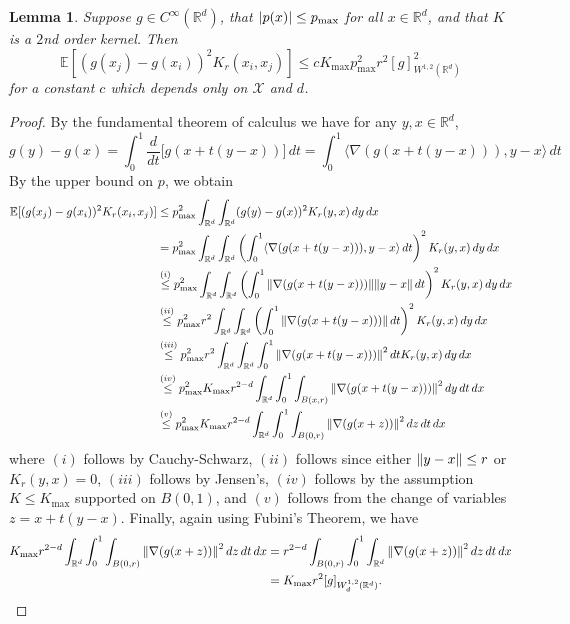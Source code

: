 \documentclass{article}
\newcommand{\Reals}{\mathbb{R}}
\newcommand{\1}{\mathbf{1}}
\newcommand{\Rd}{\Reals^d}
\newcommand{\Xset}{\mathcal{X}}
\newcommand{\Ebb}{\mathbb{E}}
\newcommand{\dotp}[2]{\langle #1, #2 \rangle}
\theoremstyle{alden}
\theoremstyle{aldenthm}
\newtheorem{lemma}{Lemma}
\theoremstyle{definition}
\theoremstyle{remark}
\begin{document}
\begin{lemma}
	\label{lem:expected_first_order_seminorm}
	Suppose $g \in C^{\infty}(\Rd)$, that $\abs{p(x)} \leq p_{\max}$ for all $x \in \Rd$, and that $K$ is a $2$nd order kernel. Then
	\begin{equation*}
	\Ebb[(g(x_j) - g(x_i))^2K_r(x_i,x_j)] \leq c K_{\max} p_{\max}^2 r^2 [g]_{W^{1,2}(\Rd)}^2
	\end{equation*}
	for a constant $c$ which depends only on $\Xset$ and $d$.
\end{lemma}
\begin{proof}
	By the fundamental theorem of calculus we have for any $y,x \in \Rd$,
	\begin{equation*}
	g(y) - g(x) = \int_{0}^{1} \frac{d}{dt}\bigl[g(x + t(y - x))\bigr] \,dt = \int_{0}^{1} \dotp{\nabla(g(x + t(y - x)))}{y - x} \,dt
	\end{equation*}
	By the upper bound on $p$, we obtain
	\begin{align*}
	\Ebb[(g(x_j) - g(x_i))^2K_r(x_i,x_j)] & \leq p_{\max}^2 \int_{\Rd} \int_{\Rd} (g(y) - g(x))^2 K_r(y,x) \,dy \,dx\\
	& = p_{\max}^2 \int_{\Rd} \int_{\Rd} \left(\int_{0}^{1} \dotp{\nabla(g(x + t(y - x)))}{y - x} \,dt\right)^2 K_r(y,x) \,dy \,dx \\
	& \overset{(i)}{\leq} p_{\max}^2 \int_{\Rd} \int_{\Rd} \left(\int_{0}^{1} \norm{\nabla(g(x + t(y - x)))}\norm{y - x} \,dt\right)^2 K_r(y,x) \,dy \,dx \\
	& \overset{(ii)}{\leq} p_{\max}^2 r^2\int_{\Rd} \int_{\Rd} \left(\int_{0}^{1} \norm{\nabla(g(x + t(y - x)))}\,dt\right)^2 K_r(y,x) \,dy \,dx \\
	& \overset{(iii)}{\leq} p_{\max}^2 r^2\int_{\Rd} \int_{\Rd} \int_{0}^{1} \norm{\nabla(g(x + t(y - x)))}^2 \,dt K_r(y,x) \,dy \,dx \\
	& \overset{(iv)}{\leq} p_{\max}^2 K_{\max} r^{2 - d}\int_{\Rd} \int_{0}^{1} \int_{B(x,r)} \norm{\nabla(g(x + t(y - x)))}^2 \,dy \,dt \,dx \\
	& \overset{(v)}{\leq}  p_{\max}^2 K_{\max} r^{2 - d}\int_{\Rd} \int_{0}^{1} \int_{B(0,r)} \norm{\nabla(g(x + z))}^2  \,dz \,dt \,dx
	\end{align*}
	where $(i)$ follows by Cauchy-Schwarz, $(ii)$ follows since either $\norm{y - x} \leq r$ or $K_r(y,x) = 0$, $(iii)$ follows by Jensen's, $(iv)$ follows by the assumption $K \leq K_{\max}$ supported on $B(0,1)$, and $(v)$ follows from the change of variables $z = x + t(y - x)$. Finally, again using Fubini's Theorem, we have
	\begin{align*}
	K_{\max} r^{2 - d}\int_{\Rd} \int_{0}^{1} \int_{B(0,r)} \norm{\nabla(g(x + z))}^2  \,dz \,dt \,dx & = r^{2 - d}\int_{B(0,r)} \int_{0}^{1} \int_{\Rd} \norm{\nabla(g(x + z))}^2  \,dz \,dt \,dx \\
	& = K_{\max} r^2 [g]_{W_d^{1,2}(\Rd)}.
	\end{align*}
\end{proof}
\end{document}
